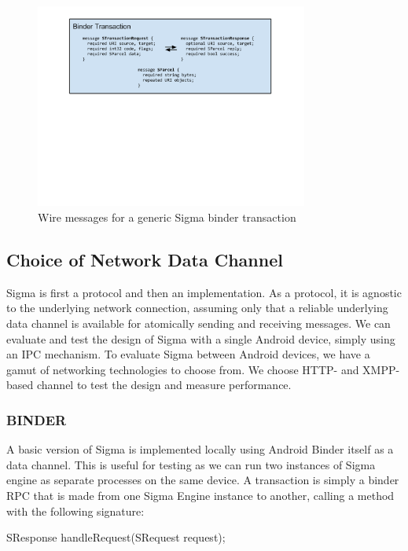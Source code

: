 \documentclass[prodmode]{acmlarge}
\begin{document}
\begin{figure}[h!]
\centering
\includegraphics[width=0.8\textwidth]{drawings/WireBinderTransaction.pdf}
\caption{Wire messages for a generic Sigma binder transaction}
\label{fig:GenericSigmaBinderTransaction}
\end{figure}

\subsection{Choice of Network Data Channel}
Sigma is first a protocol and then an implementation. As a protocol, it is agnostic to the underlying network connection, assuming only that a reliable underlying data channel is available for atomically sending and receiving messages. We can evaluate and test the design of Sigma with a single Android device, simply using an IPC mechanism. To evaluate Sigma between Android devices, we have a gamut of networking technologies to choose from. We choose HTTP- and XMPP- based channel to test the design and measure performance.

\subsubsection{BINDER}
A basic version of Sigma is implemented locally using Android Binder itself as a data channel. This is useful for testing as we can run two instances of Sigma engine as separate processes on the same device. A transaction is simply a binder RPC that is made from one Sigma Engine instance to another, calling a method with the following signature:

\begin{snippet}
SResponse handleRequest(SRequest request);
\end{snippet}
\end{document}
